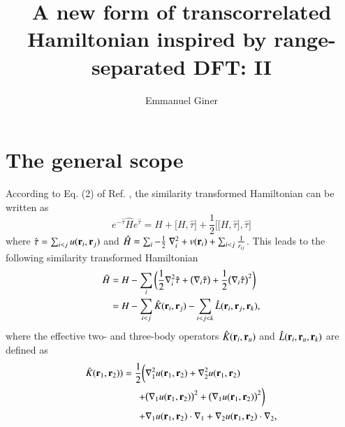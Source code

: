 \documentclass[aip,jcp,reprint,noshowkeys,superscriptaddress]{revtex4-1}
\newcommand{\br}[0]{{\bf {r}}}
\newcommand{\bri}[1]{{\bf r}_{#1}}
\begin{document}
	

\title{A new form of transcorrelated Hamiltonian inspired by range-separated DFT: II }

\author{Emmanuel Giner}

\begin{abstract}

\end{abstract}

\maketitle

\section{The general scope}
According to Eq. (2) of Ref. , the similarity transformed Hamiltonian can be written as 
\begin{equation}
 \label{ht_def_g}
 e^{-\hat{\tau}} \hat{H} e^{\hat{\tau}} = H + \big[ H,\hat{\tau} \big] + \frac{1}{2}\bigg[ \big[H,\hat{\tau}\big],\hat{\tau}\bigg]
\end{equation}
where $\hat{\tau} = \sum_{i<j}u(\br{}_i,\br{}_j)$ and $\hat{H} = \sum_i -\frac{1}{2} \nabla^2_i + v(\br{}_i) + \sum_{i<j} \frac{1}{r_{ij}}$. 
This leads to the following similarity transformed Hamiltonian 
\begin{equation}
 \begin{aligned}
 \label{ht_def_gu}
 \tilde{H} & = H - \sum_i \bigg( \frac{1}{2} \nabla_i^2 \hat{\tau} + \big(\nabla_i \hat{\tau} \big) + \frac{1}{2} \big(\nabla_i \hat{\tau} \big)^2  \bigg) \\
           & = H - \sum_{i<j} \hat{K}(\bri{i},\bri{j}) - \sum_{i<j<k} \hat{L}(\bri{i},\bri{j},\bri{k}),
 \end{aligned}
\end{equation}
where the effective two- and three-body operators $\hat{K}(\bri{i},\bri{u})$ and $\hat{L}(\bri{i},\bri{u},\bri{k})$ are defined as
\begin{equation}
 \begin{aligned}
 \label{def_k}
  \hat{K}(\bri{1},\bri{2}) ) = \frac{1}{2} \bigg( &\nabla_1^2 u(\bri{1},\bri{2}) + \nabla_2^2u(\bri{1},\bri{2}) \\
                                               + &\big(\nabla_1 u(\bri{1},\bri{2}) \big) ^2 + \big(\nabla_1 u(\bri{1},\bri{2}) \big) ^2 \bigg) \\
                                               + &\nabla_1 u(\bri{1},\bri{2}) \cdot \nabla_1 + \nabla_2 u(\bri{1},\bri{2}) \cdot \nabla_2,
 \end{aligned}
\end{equation}
\end{document}

